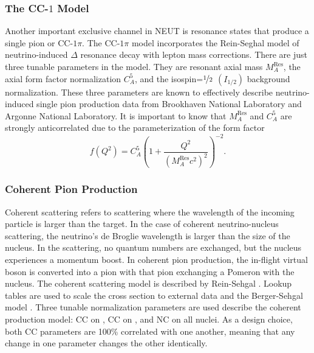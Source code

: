 \subsubsection{The CC-$1$\pititle{} Model}

Another important exclusive channel in NEUT is resonance states that
produce a single pion or CC-$1\pi$. The CC-$1\pi$ model incorporates
the Rein-Seghal model of neutrino-induced $\Delta$ resonance decay\cite{PhysRevD.90.093001,Graczyk:2009qm,PhysRevD.77.053001,rein-sehgal}
with lepton mass corrections\cite{PhysRevD.77.053003,PhysRevD.76.113004}.
There are just three tunable parameters in the model. They are resonant
axial mass $M_{A}^{\text{Res}}$, the axial form factor normalization
$C_{A}^{5}$, and the isospin=$\nicefrac{1}{2}$ $\left(I_{1/2}\right)$
background normalization. These three parameters are known to effectively
describe neutrino-induced single pion production data from Brookhaven
National Laboratory\cite{PhysRevD.34.2554} and Argonne National Laboratory\cite{PhysRevD.25.1161}.
It is important to know that $M_{A}^{\text{Res}}$ and $C_{A}^{5}$
are strongly anticorrelated due to the parameterization of the form
factor
\begin{equation}
f\left(Q^{2}\right)=C_{A}^{5}\left(1+\frac{Q^{2}}{\left(M_{A}^{\text{Res}}c^{2}\right)^{2}}\right)^{-2}.\label{eq:CC1piaxialformfactor}
\end{equation}


\subsubsection{Coherent Pion Production}

Coherent scattering refers to scattering where the wavelength of the
incoming particle is larger than the target. In the case of coherent
neutrino-nucleus scattering, the neutrino's de Broglie wavelength
is larger than the size of the nucleus. In the scattering, no quantum
numbers are exchanged, but the nucleus experiences a momentum boost.
In coherent pion production, the in-flight virtual boson is converted
into a pion with that pion exchanging a Pomeron\cite{Abe2016} with
the nucleus. The coherent scattering model is described by Rein-Sehgal
\cite{REIN198329}. Lookup tables are used to scale the cross section
to external data\cite{Wret2019} and the Berger-Sehgal model \cite{PhysRevD.76.113004}.
Three tunable normalization parameters are used describe the coherent
production model: CC on , CC on , and NC on
all nuclei. As a design choice, both CC parameters are 100\% correlated
with one another, meaning that any change in one parameter changes
the other identically.

